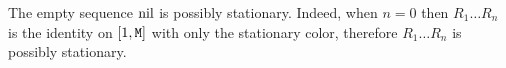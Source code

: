 \documentclass{lmcs}
\newtheorem{lemma}[theorem]{Lemma}
\newtheorem{definition}[theorem]{Definition}
\begin{document}
The empty sequence ${{\rm nil}}$ is possibly stationary.
Indeed, when $n=0$ then $R_1 \ldots R_n$ is the identity on $[1,{\tt M}]$ with only
the stationary color, therefore $R_1 \ldots R_n$ is possibly stationary. 

%
%

%
%
%
%
%


\end{document}
